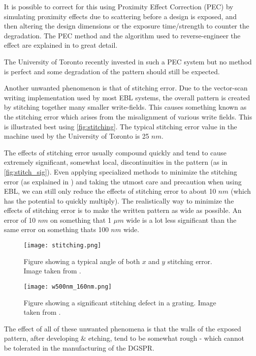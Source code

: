 It is possible to correct for this using Proximity Effect Correction (PEC) by simulating proximity effects due to scattering before a design is exposed, and then altering the design dimensions or the exposure time/strength to counter the degradation. The PEC method and the algorithm used to reverse-engineer the effect are explained in \cite{PEC} to great detail. 

The University of Toronto recently invested in such a PEC system but no method is perfect and some degradation of the pattern should still be expected. 

Another unwanted phenomenon is that of stitching error. Due to the vector-scan writing implementation used by most EBL systems, the overall pattern is created by stitching together many smaller write-fields. This causes something known as the stitching error which arises from the misalignment of various write fields. This is illustrated best using \autoref{fig:stitching}. The typical stitching error value in the machine used by the University of Toronto is 25 $nm$. 

The effects of stitching error usually compound quickly and tend to cause extremely significant, somewhat local, discontinuities in the pattern (as in \autoref{fig:stitch_sig}). Even applying specialized methods to minimize the stitching error (as explained in \cite{stitch_signi}) and taking the utmost care and precaution when using EBL, we can still only reduce the effects of stitching error to about 10 $nm$ (which has the potential to quickly multiply). The realistically way to minimize the effects of stitching error is to make the written pattern as wide as possible. An error of 10 $nm$ on something that 1 $\mu m$ wide is a lot less significant than the same error on something thats 100 $nm$ wide.

\begin{figure}
\centering
\texttt{[image: stitching.png]}
\caption{Figure showing a typical angle of both $x$ and $y$ stitching error. Image taken from \cite{stitch_img}.}
\label{fig:stitching}
\end{figure}

\begin{figure}
\centering
\texttt{[image: w500nm\_160nm.png]}
\caption{Figure showing a significant stitching defect in a grating. Image taken from \cite{stitch_signi}.}
\label{fig:stitch_sig}
\end{figure}

The effect of all of these unwanted phenomena is that the walls of the exposed pattern, after developing \& etching, tend to be somewhat rough - which cannot be tolerated in the manufacturing of the DGSPR. 

